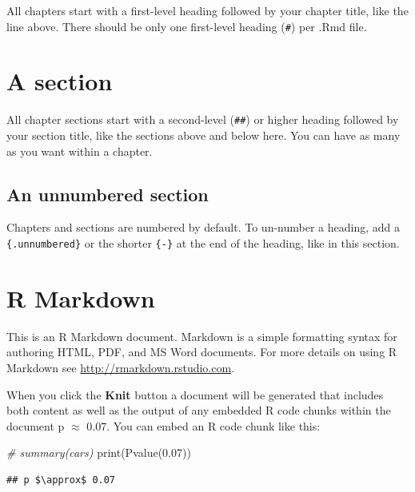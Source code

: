 \documentclass[
  12pt,
]{book}
\newenvironment{Shaded}{\begin{snugshade}}{\end{snugshade}}
\newcommand{\CommentTok}[1]{\textcolor[rgb]{0.56,0.35,0.01}{\textit{#1}}}
\newcommand{\FloatTok}[1]{\textcolor[rgb]{0.00,0.00,0.81}{#1}}
\newcommand{\FunctionTok}[1]{\textcolor[rgb]{0.00,0.00,0.00}{#1}}
\newcommand{\NormalTok}[1]{#1}
\theoremstyle{definition}
\theoremstyle{definition}
\theoremstyle{definition}
\theoremstyle{definition}
\theoremstyle{remark}
\begin{document}
All chapters start with a first-level heading followed by your chapter title, like the line above. There should be only one first-level heading (\texttt{\#}) per .Rmd file.

\hypertarget{a-section}{%
\section{A section}\label{a-section}}

All chapter sections start with a second-level (\texttt{\#\#}) or higher heading followed by your section title, like the sections above and below here. You can have as many as you want within a chapter.

\hypertarget{an-unnumbered-section}{%
\subsection*{An unnumbered section}\label{an-unnumbered-section}}

Chapters and sections are numbered by default. To un-number a heading, add a \texttt{\{.unnumbered\}} or the shorter \texttt{\{-\}} at the end of the heading, like in this section.

\hypertarget{r-markdown}{%
\section{R Markdown}\label{r-markdown}}

This is an R Markdown document. Markdown is a simple formatting syntax for authoring HTML, PDF, and MS Word documents. For more details on using R Markdown see \url{http://rmarkdown.rstudio.com}.

When you click the \textbf{Knit} button a document will be generated that includes both content as well as the output of any embedded R code chunks within the document p \(\approx\) 0.07. You can embed an R code chunk like this:

\begin{Shaded}
\begin{Highlighting}[]
\CommentTok{\# summary(cars)}
\FunctionTok{print}\NormalTok{(}\FunctionTok{Pvalue}\NormalTok{(}\FloatTok{0.07}\NormalTok{))}
\end{Highlighting}
\end{Shaded}

\begin{verbatim}
## p $\approx$ 0.07
\end{verbatim}
\end{document}
